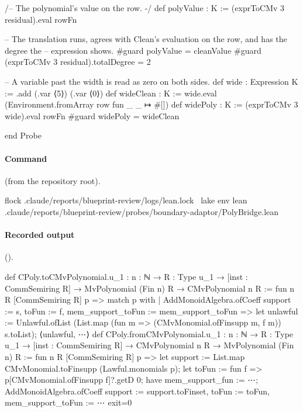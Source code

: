 \begin{leancode}[numbers=left,numbersep=3pt]
/-- The polynomial's value on the row. -/
def polyValue : K := (exprToCMv 3 residual).eval rowFn

-- The translation runs, agrees with Clean's evaluation on the row, and has the degree the
-- expression shows.
#guard polyValue = cleanValue
#guard (exprToCMv 3 residual).totalDegree = 2

-- A variable past the width is read as zero on both sides.
def wide : Expression K := .add (.var ⟨5⟩) (.var ⟨0⟩)
def wideClean : K := wide.eval (Environment.fromArray row fun _ _ ↦ #[])
def widePoly : K := (exprToCMv 3 wide).eval rowFn
#guard widePoly = wideClean

end Probe
\end{leancode}

\paragraph{Command} (from the repository root).
\begin{shellcode}
flock .claude/reports/blueprint-review/logs/lean.lock \
  lake env lean .claude/reports/blueprint-review/probes/boundary-adaptor/PolyBridge.lean
\end{shellcode}

\paragraph{Recorded output} ().
\begin{srccode}[numbers=left,numbersep=3pt]
def CPoly.toCMvPolynomial.{u_1} : {n : ℕ} →
  {R : Type u_1} → [inst : CommSemiring R] → MvPolynomial (Fin n) R → CMvPolynomial n R :=
fun {n} {R} [CommSemiring R] p =>
  match p with
  | AddMonoidAlgebra.ofCoeff { support := s, toFun := f, mem_support_toFun := mem_support_toFun } =>
    let unlawful := Unlawful.ofList (List.map (fun m => (CMvMonomial.ofFinsupp m, f m)) s.toList);
    ⟨unlawful, ⋯⟩
def CPoly.fromCMvPolynomial.{u_1} : {n : ℕ} →
  {R : Type u_1} → [inst : CommSemiring R] → CMvPolynomial n R → MvPolynomial (Fin n) R :=
fun {n} {R} [CommSemiring R] p =>
  let support := List.map CMvMonomial.toFinsupp (Lawful.monomials p);
  let toFun := fun f => p[CMvMonomial.ofFinsupp f]?.getD 0;
  have mem_support_fun := ⋯;
  AddMonoidAlgebra.ofCoeff { support := support.toFinset, toFun := toFun, mem_support_toFun := ⋯ }
exit=0
\end{srccode}

\subsection{\texorpdfstring{\protect{}}{PolyBridgeNew}}\label{sec:gen-boundary-probe-polybridgenew}

